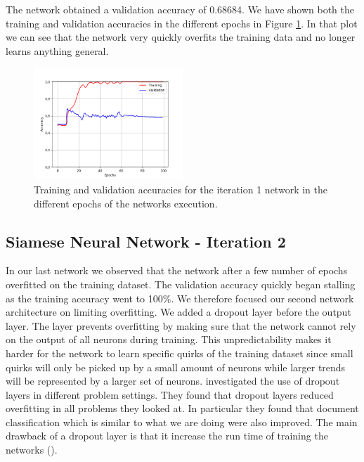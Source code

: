The network obtained a validation accuracy of 0.68684. We have shown both the
training and validation accuracies in the different epochs in Figure
\ref{fig:network1_accuracies}. In that plot we can see that the network very
quickly overfits the training data and no longer learns anything general.

\begin{figure}[htb]
    \centering
    \includegraphics[width=0.5\textwidth]{./pictures/experiments/network_1_accuracies.png}
    \caption{Training and validation accuracies for the iteration 1 network in
        the different epochs of the networks execution.}
    \label{fig:network1_accuracies}
\end{figure}


\subsection{Siamese Neural Network - Iteration 2}


In our last network we observed that the network after a few number of epochs
overfitted on the training dataset. The validation accuracy quickly began
stalling as the training accuracy went to 100\%. We therefore focused our
second network architecture on limiting overfitting. We added a dropout layer
before the output layer. The layer prevents overfitting by making sure that
the network cannot rely on the output of all neurons during training. This
unpredictability makes it harder for the network to learn specific quirks of
the training dataset since small quirks will only be picked up by a small
amount of neurons while larger trends will be represented by a larger set
of neurons. \cite{JMLR:v15:srivastava14a} investigated the use of dropout
layers in different problem settings. They found that dropout layers reduced
overfitting in all problems they looked at. In particular they found that
document classification which is similar to what we are doing were also
improved. The main drawback of a dropout layer is that it increase the run time
of training the networks (\cite{JMLR:v15:srivastava14a}).

